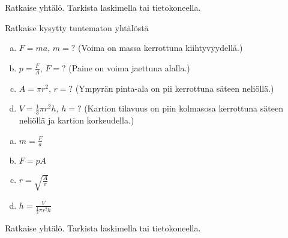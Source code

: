 \begin{tehtava}
Ratkaise yhtälö. Tarkista laskimella tai tietokoneella.
\begin{alakohdat}
\end{alakohdat}
%
\begin{vastaus}
\begin{alakohdat}
\end{alakohdat}
%
\end{vastaus}
\end{tehtava}





\begin{tehtava}
Ratkaise kysytty tuntematon yhtälöstä
\begin{enumerate}[a)]
\item $F=ma$, $m=?$ (Voima on massa kerrottuna kiihtyvyydellä.)
\item $p=\frac{F}{A}$, $F=?$ (Paine on voima jaettuna alalla.)
\item $A=\pi r^2$, $r=?$ (Ympyrän pinta-ala on pii kerrottuna säteen neliöllä.)
\item $V=\frac{1}{3} \pi r^2 h$, $h=?$ (Kartion tilavuus on piin kolmasosa
kerrottuna säteen neliöllä ja kartion korkeudella.)
\end{enumerate}
\begin{vastaus}
\begin{enumerate}[a)]
\item $m=\frac{F}{a}$
\item $F=p A$
\item $r=\sqrt{\frac{A}{\pi}}$
\item $h=\frac{V}{ \frac{1}{3} \pi r^2 h}$
\end{enumerate}
\end{vastaus}
\end{tehtava}

\begin{tehtava}
Ratkaise yhtälö. Tarkista laskimella tai tietokoneella.
\begin{alakohdat}
\end{alakohdat}
%
\begin{vastaus}
\begin{alakohdat}
\end{alakohdat}
\end{vastaus}
\end{tehtava}


